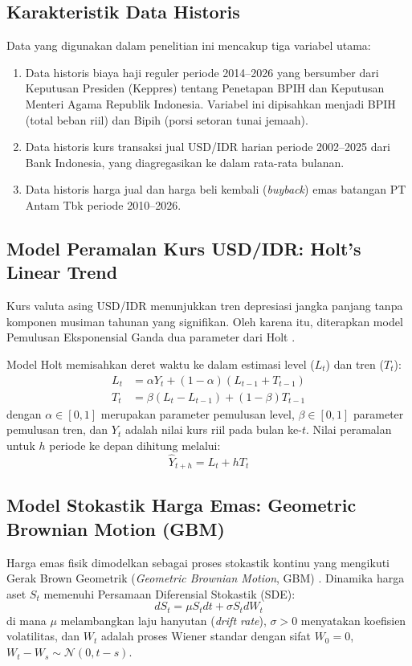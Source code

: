 \documentclass[journal,twoside]{IEEEtran}
\begin{document}
\subsection{Karakteristik Data Historis}
Data yang digunakan dalam penelitian ini mencakup tiga variabel utama:
\begin{enumerate}
    \item Data historis biaya haji reguler periode 2014--2026 yang bersumber dari Keputusan Presiden (Keppres) tentang Penetapan BPIH dan Keputusan Menteri Agama Republik Indonesia. Variabel ini dipisahkan menjadi BPIH (total beban riil) dan Bipih (porsi setoran tunai jemaah).
    \item Data historis kurs transaksi jual USD/IDR harian periode 2002--2025 dari Bank Indonesia, yang diagregasikan ke dalam rata-rata bulanan.
    \item Data historis harga jual dan harga beli kembali (\textit{buyback}) emas batangan PT Antam Tbk periode 2010--2026.
\end{enumerate}

\subsection{Model Peramalan Kurs USD/IDR: Holt's Linear Trend}
Kurs valuta asing USD/IDR menunjukkan tren depresiasi jangka panjang tanpa komponen musiman tahunan yang signifikan. Oleh karena itu, diterapkan model Pemulusan Eksponensial Ganda dua parameter dari Holt \cite{holt2004forecasting}.

Model Holt memisahkan deret waktu ke dalam estimasi level ($L_t$) dan tren ($T_t$):
\begin{align}
L_t &= \alpha Y_t + (1 - \alpha)(L_{t-1} + T_{t-1}) \label{eq:holt_level} \\
T_t &= \beta (L_t - L_{t-1}) + (1 - \beta)T_{t-1} \label{eq:holt_trend}
\end{align}
dengan $\alpha \in [0,1]$ merupakan parameter pemulusan level, $\beta \in [0,1]$ parameter pemulusan tren, dan $Y_t$ adalah nilai kurs riil pada bulan ke-$t$. Nilai peramalan untuk $h$ periode ke depan dihitung melalui:
\begin{equation}
\hat{Y}_{t+h} = L_t + h T_t \label{eq:holt_forecast}
\end{equation}

\subsection{Model Stokastik Harga Emas: Geometric Brownian Motion (GBM)}
Harga emas fisik dimodelkan sebagai proses stokastik kontinu yang mengikuti Gerak Brown Geometrik (\textit{Geometric Brownian Motion}, GBM) \cite{hull2003options}. Dinamika harga aset $S_t$ memenuhi Persamaan Diferensial Stokastik (SDE):
\begin{equation}
dS_t = \mu S_t dt + \sigma S_t dW_t \label{eq:gbm_sde}
\end{equation}
di mana $\mu$ melambangkan laju hanyutan (\textit{drift rate}), $\sigma > 0$ menyatakan koefisien volatilitas, dan $W_t$ adalah proses Wiener standar dengan sifat $W_0 = 0$, $W_t - W_s \sim \mathcal{N}(0, t-s)$.
\end{document}
